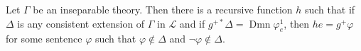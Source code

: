Let $\Gamma$ be an inseparable theory. Then there is a recursive function $h$ such that if $\Delta$ is any consistent extension of $\Gamma$ in $\mathcal{L}$ and if $g^{+*} \Delta = \operatorname{Dmn} \varphi_{e}^{1}$, then $h e = g^{+} \varphi$ for some sentence $\varphi$ such that $\varphi \notin \Delta$ and $\neg \varphi \notin \Delta$.
